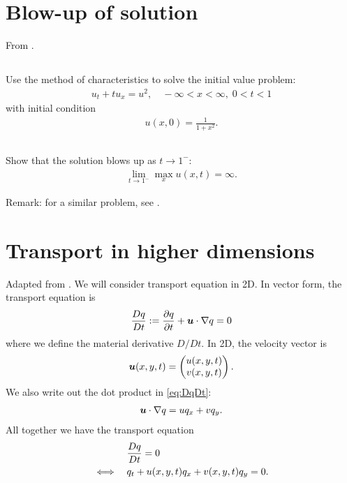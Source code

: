 \documentclass[11pt,letterpaper]{article}
\begin{document}
\section{Blow-up of solution}
From \cite[Excercise 3.8]{ShearerLevy_15}. 

\subsection{}
Use the method of characteristics to solve the initial value problem: 
\begin{align}
    u_t+tu_x = u^2,\quad -\infty<x<\infty,\; 0<t<1
\end{align}
with initial condition 
\begin{align}
    u(x,0) = \frac{1}{1+x^2}.
\end{align}

\subsection{}
Show that the solution blows up as $t\to 1^-$:
\begin{align}
    \lim_{t\to 1^-} \max_x u(x,t) = \infty.
\end{align}

Remark: for a similar problem, see \cite[Problem 2.2.11]{Olver_14}.

\section{Transport in higher dimensions}
Adapted from \cite[Problem 2.2.31]{Olver_14}. We will consider transport equation in 2D. In vector form, the transport equation is
\begin{align}
    \frac{Dq}{Dt}:= \frac{\partial q}{\partial t} + \boldsymbol{u}\cdot\nabla q = 0\label{eq:DqDt}
\end{align}
where we define the material derivative $D/Dt$. In 2D, the velocity vector is
\begin{align}
    \boldsymbol{u}(x,y,t) = \begin{pmatrix}
    u(x,y,t)\\v(x,y,t)
    \end{pmatrix}.
\end{align}
We also write out the dot product in \eqref{eq:DqDt}:
\begin{align}
    \boldsymbol{u}\cdot\nabla q = uq_x+vq_y. 
\end{align}
All together we have the transport equation
\begin{align}
    &\frac{Dq}{Dt} = 0\\
    \iff\quad & q_t + u(x,y,t)q_x+v(x,y,t)q_y = 0.
\end{align}
\end{document}
